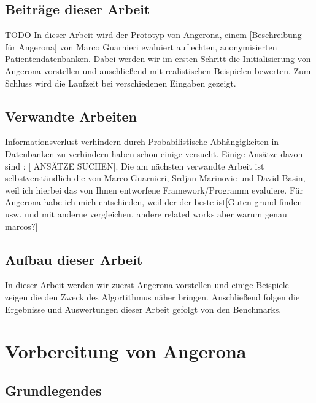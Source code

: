 \documentclass[german,version-2020-11]{uzl-thesis}
\begin{document}

\section{Beiträge dieser Arbeit}
TODO
In dieser Arbeit wird der Prototyp von Angerona, einem [Beschreibung für Angerona] von Marco Guarnieri evaluiert auf echten, anonymisierten Patientendatenbanken. Dabei werden wir im ersten Schritt  die Initialisierung von Angerona vorstellen und anschließend mit realistischen Beispielen bewerten. Zum Schluss wird die Laufzeit bei verschiedenen Eingaben gezeigt.


\section{Verwandte Arbeiten}
Informationsverlust verhindern durch Probabilistische Abhängigkeiten in Datenbanken zu verhindern haben schon einige versucht. Einige Ansätze davon sind : [ ANSÄTZE SUCHEN]. Die am nächsten verwandte Arbeit ist selbstverständlich die von Marco Guarnieri, Srdjan Marinovic und David Basin, weil ich hierbei das von Ihnen entworfene Framework/Programm evaluiere. Für Angerona habe ich mich entschieden, weil der der beste ist[Guten grund finden usw. und mit anderne vergleichen, andere related works aber warum genau marcos?]


\section{Aufbau dieser Arbeit}
In dieser Arbeit werden wir zuerst Angerona vorstellen und einige Beispiele zeigen die den Zweck des Algortithmus näher bringen. Anschließend folgen die Ergebnisse und Auswertungen dieser Arbeit gefolgt von den Benchmarks.
\chapter{Vorbereitung von Angerona}
\section{Grundlegendes}
\end{document}
